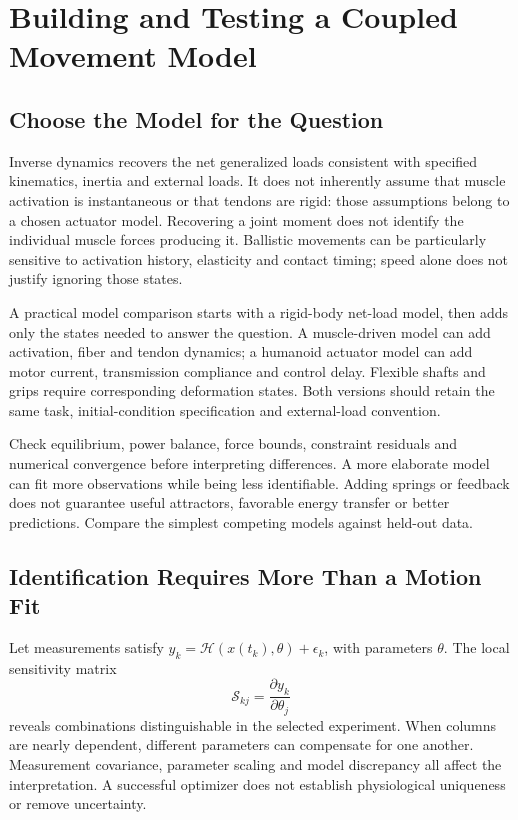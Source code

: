 \section{Building and Testing a Coupled Movement Model}

\subsection{Choose the Model for the Question}

Inverse dynamics recovers the net generalized loads consistent with specified
kinematics, inertia and external loads. It does not inherently assume that
muscle activation is instantaneous or that tendons are rigid: those assumptions
belong to a chosen actuator model. Recovering a joint moment does not identify
the individual muscle forces producing it. Ballistic movements can be particularly
sensitive to activation history, elasticity and contact timing; speed alone
does not justify ignoring those states.

A practical model comparison starts with a rigid-body net-load model, then
adds only the states needed to answer the question. A muscle-driven model can
add activation, fiber and tendon dynamics; a humanoid actuator model can add
motor current, transmission compliance and control delay. Flexible shafts and
grips require corresponding deformation states. Both versions should retain
the same task, initial-condition specification and external-load convention.

Check equilibrium, power balance, force bounds, constraint residuals and numerical
convergence before interpreting differences. A more elaborate model can fit
more observations while being less identifiable. Adding springs or feedback
does not guarantee useful attractors, favorable energy transfer or better
predictions. Compare the simplest competing models against held-out data.

\subsection{Identification Requires More Than a Motion Fit}

Let measurements satisfy $y_k=\mathcal H(x(t_k),\theta)+\epsilon_k$, with
parameters $\theta$. The local sensitivity matrix
\begin{equation}
\mathcal S_{kj}=\frac{\partial y_k}{\partial\theta_j}
\label{eq:ch8:identification}
\end{equation}
reveals combinations distinguishable in the selected experiment. When columns
are nearly dependent, different parameters can compensate for one another.
Measurement covariance, parameter scaling and model discrepancy all affect
the interpretation. A successful optimizer does not establish physiological
uniqueness or remove uncertainty.

